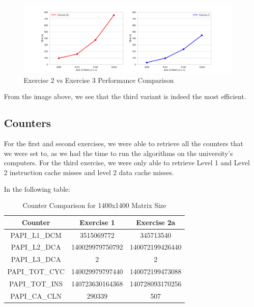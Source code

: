 \documentclass[10pt, titlepage]{extarticle}
\begin{document}
\begin{figure}[H]
    \centering
    \includegraphics[width=.9\linewidth]{../plots/ex2b-ex3-overall.png}
    \caption{Exercise 2 vs Exercise 3 Performance Comparison}
    \label{ex3-overall}
\end{figure}

From the image above, we see that the third variant is indeed the most efficient.

\subsection{Counters}\label{Counters}

For the first and second exercises, we were able to retrieve all the counters that we were set to, as we had the time to run
the algorithms on the university's computers. For the third exercise, we were only able to retrieve Level 1 and Level 2 instruction cache misses
and level 2 data cache misses.

In the following table:

\begin{table}[H]
    \centering
    \begin{tabular}{|c|c|c|}
        \hline
        \textbf{Counter} & \textbf{Exercise 1} & \textbf{Exercise 2a} \\ \hline
        PAPI\_L1\_DCM    & 3515069772          & 345713540            \\ \hline
        PAPI\_L2\_DCA    & 140029979750792     & 140072199426440      \\ \hline
        PAPI\_L3\_DCA    & 2                   & 2                    \\ \hline
        PAPI\_TOT\_CYC   & 140029979797440     & 140072199473088      \\ \hline
        PAPI\_TOT\_INS   & 140723630164368     & 140728093170256      \\ \hline
        PAPI\_CA\_CLN    & 290339              & 507                  \\ \hline
    \end{tabular}
    \caption{Counter Comparison for 1400x1400 Matrix Size}
\end{table}
\end{document}
